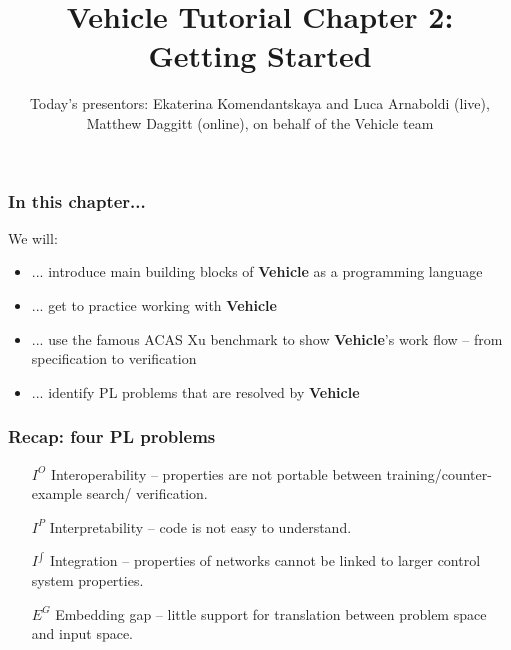\documentclass[aspectratio=169]{beamer}
\title[Vehicle Tutorial Chapter 2]{Vehicle Tutorial Chapter 2: Getting Started}
\author[Vehicle]{Today's presentors: Ekaterina Komendantskaya and Luca Arnaboldi  (live), Matthew Daggitt (online), on behalf of the Vehicle team}
\institute[]{}
\date[]{}
\newcommand\BackgroundPicture[1]{%
  \setbeamertemplate{background}{%
   \parbox[c][\paperheight]{\paperwidth}{%
      \vfill \hfill
\texttt{[image: \#1]}
        \hfill \vfill
     }}}
\begin{document}
\BackgroundPicture{logo1.png}

\begin{frame}
\titlepage
\end{frame}

\begin{frame}
\frametitle{In this chapter...}

We will:

\begin{itemize}[<+->]
\item  ... introduce main building blocks of \textbf{Vehicle} as a programming language
\item ... get to practice working with \textbf{Vehicle}
\item ... use the famous ACAS Xu benchmark to show \textbf{Vehicle}'s work flow --
from specification to verification
\item ... identify PL problems that are resolved by \textbf{Vehicle}

\end{itemize}

\end{frame}


\begin{frame}
\frametitle{Recap: four PL problems}

\begin{itemize}
\item[$I^O$] Interoperability -- properties are not portable between training/counter-example search/ verification.

\item[$I^{P}$] Interpretability -- code is not easy to understand.

\item[$I^{\int}$] Integration -- properties of networks cannot be linked to larger control system properties.

\item[$E^G$] Embedding gap -- little support for translation between problem space  and input space.
\end{itemize}
\end{frame}
\end{document}
